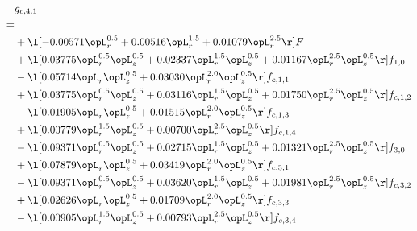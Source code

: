 \begin{alignat}{2} 
\label{eq:g_41_0} 
& g_{c,4,1} \nonumber \\ 
 = \\ 
& + \l[  -0.00571 \opL_r^{0.5} +  0.00516 \opL_r^{1.5} +  0.01079 \opL_r^{2.5}  \r] F \nonumber \\ 
& + \l[  0.03775 \opL_r^{0.5} \opL_z^{0.5} +  0.02337 \opL_r^{1.5} \opL_z^{0.5} +  0.01167 \opL_r^{2.5} \opL_z^{0.5}  \r] f_{1,0} \nonumber \\ 
& - \l[  0.05714 \opL_r \opL_z^{0.5} +  0.03030 \opL_r^{2.0} \opL_z^{0.5}  \r] f_{c,1,1} \nonumber \\ 
& + \l[  0.03775 \opL_r^{0.5} \opL_z^{0.5} +  0.03116 \opL_r^{1.5} \opL_z^{0.5} +  0.01750 \opL_r^{2.5} \opL_z^{0.5}  \r] f_{c,1,2} \nonumber \\ 
& - \l[  0.01905 \opL_r \opL_z^{0.5} +  0.01515 \opL_r^{2.0} \opL_z^{0.5}  \r] f_{c,1,3} \nonumber \\ 
& + \l[  0.00779 \opL_r^{1.5} \opL_z^{0.5} +  0.00700 \opL_r^{2.5} \opL_z^{0.5}  \r] f_{c,1,4} \nonumber \\ 
& - \l[  0.09371 \opL_r^{0.5} \opL_z^{0.5} +  0.02715 \opL_r^{1.5} \opL_z^{0.5} +  0.01321 \opL_r^{2.5} \opL_z^{0.5}  \r] f_{3,0} \nonumber \\ 
& + \l[  0.07879 \opL_r \opL_z^{0.5} +  0.03419 \opL_r^{2.0} \opL_z^{0.5}  \r] f_{c,3,1} \nonumber \\ 
& - \l[  0.09371 \opL_r^{0.5} \opL_z^{0.5} +  0.03620 \opL_r^{1.5} \opL_z^{0.5} +  0.01981 \opL_r^{2.5} \opL_z^{0.5}  \r] f_{c,3,2} \nonumber \\ 
& + \l[  0.02626 \opL_r \opL_z^{0.5} +  0.01709 \opL_r^{2.0} \opL_z^{0.5}  \r] f_{c,3,3} \nonumber \\ 
& - \l[  0.00905 \opL_r^{1.5} \opL_z^{0.5} +  0.00793 \opL_r^{2.5} \opL_z^{0.5}  \r] f_{c,3,4} \nonumber \\ 
\end{alignat} 


